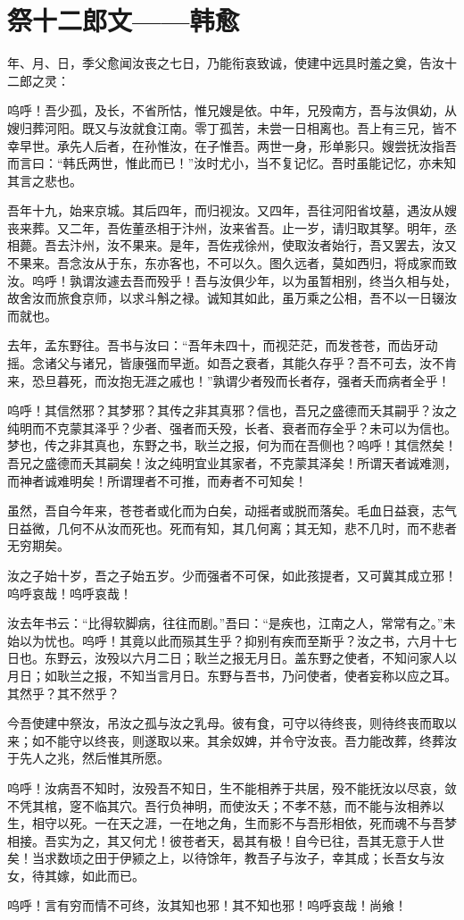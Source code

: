 \section{ 祭十二郎文——韩愈}

年、月、日，季父愈闻汝丧之七日，乃能衔哀致诚，使建中远具时羞之奠，告汝十二郎之灵：

呜呼！吾少孤，及长，不省所怙，惟兄嫂是依。中年，兄殁南方，吾与汝俱幼，从嫂归葬河阳。既又与汝就食江南。零丁孤苦，未尝一日相离也。吾上有三兄，皆不幸早世。承先人后者，在孙惟汝，在子惟吾。两世一身，形单影只。嫂尝抚汝指吾而言曰：“韩氏两世，惟此而已！”汝时尤小，当不复记忆。吾时虽能记忆，亦未知其言之悲也。

吾年十九，始来京城。其后四年，而归视汝。又四年，吾往河阳省坟墓，遇汝从嫂丧来葬。又二年，吾佐董丞相于汴州，汝来省吾。止一岁，请归取其孥。明年，丞相薨。吾去汴州，汝不果来。是年，吾佐戎徐州，使取汝者始行，吾又罢去，汝又不果来。吾念汝从于东，东亦客也，不可以久。图久远者，莫如西归，将成家而致汝。呜呼！孰谓汝遽去吾而殁乎！吾与汝俱少年，以为虽暂相别，终当久相与处，故舍汝而旅食京师，以求斗斛之禄。诚知其如此，虽万乘之公相，吾不以一日辍汝而就也。

去年，孟东野往。吾书与汝曰：“吾年未四十，而视茫茫，而发苍苍，而齿牙动摇。念诸父与诸兄，皆康强而早逝。如吾之衰者，其能久存乎？吾不可去，汝不肯来，恐旦暮死，而汝抱无涯之戚也！”孰谓少者殁而长者存，强者夭而病者全乎！

呜呼！其信然邪？其梦邪？其传之非其真邪？信也，吾兄之盛德而夭其嗣乎？汝之纯明而不克蒙其泽乎？少者、强者而夭殁，长者、衰者而存全乎？未可以为信也。梦也，传之非其真也，东野之书，耿兰之报，何为而在吾侧也？呜呼！其信然矣！吾兄之盛德而夭其嗣矣！汝之纯明宜业其家者，不克蒙其泽矣！所谓天者诚难测，而神者诚难明矣！所谓理者不可推，而寿者不可知矣！

虽然，吾自今年来，苍苍者或化而为白矣，动摇者或脱而落矣。毛血日益衰，志气日益微，几何不从汝而死也。死而有知，其几何离；其无知，悲不几时，而不悲者无穷期矣。

汝之子始十岁，吾之子始五岁。少而强者不可保，如此孩提者，又可冀其成立邪！呜呼哀哉！呜呼哀哉！

汝去年书云：“比得软脚病，往往而剧。”吾曰：“是疾也，江南之人，常常有之。”未始以为忧也。呜呼！其竟以此而殒其生乎？抑别有疾而至斯乎？汝之书，六月十七日也。东野云，汝殁以六月二日；耿兰之报无月日。盖东野之使者，不知问家人以月日；如耿兰之报，不知当言月日。东野与吾书，乃问使者，使者妄称以应之耳。其然乎？其不然乎？

今吾使建中祭汝，吊汝之孤与汝之乳母。彼有食，可守以待终丧，则待终丧而取以来；如不能守以终丧，则遂取以来。其余奴婢，并令守汝丧。吾力能改葬，终葬汝于先人之兆，然后惟其所愿。

呜呼！汝病吾不知时，汝殁吾不知日，生不能相养于共居，殁不能抚汝以尽哀，敛不凭其棺，窆不临其穴。吾行负神明，而使汝夭；不孝不慈，而不能与汝相养以生，相守以死。一在天之涯，一在地之角，生而影不与吾形相依，死而魂不与吾梦相接。吾实为之，其又何尤！彼苍者天，曷其有极！自今已往，吾其无意于人世矣！当求数顷之田于伊颍之上，以待馀年，教吾子与汝子，幸其成；长吾女与汝女，待其嫁，如此而已。

呜呼！言有穷而情不可终，汝其知也邪！其不知也邪！呜呼哀哉！尚飨！